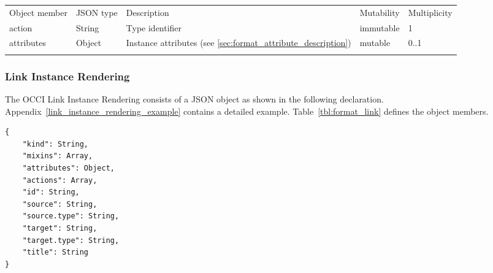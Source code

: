 \documentclass[10pt,a4paper]{article}
\begin{document}
 {
    \begin{tabularx}{\textwidth}{llXll}
    \toprule
    Object member & JSON type & Description & Mutability & Multiplicity \\
    \colrule
    action & String & Type identifier & immutable & 1 \\

    attributes & Object & Instance attributes (see
\ref{sec:format_attribute_description}) & mutable & 0..1 \\
    \botrule
    \end{tabularx}
}


\subsubsection{Link Instance Rendering}
\label{sec:format_link}

The OCCI Link Instance Rendering consists of a JSON object as shown in the
following declaration. Appendix~\ref{link_instance_rendering_example} contains a detailed example.
Table~\ref{tbl:format_link} defines the object members.
\begin{lstlisting}
{
    "kind": String,
    "mixins": Array,
    "attributes": Object,
    "actions": Array,
    "id": String,
    "source": String,
    "source.type": String,
    "target": String,
    "target.type": String,
    "title": String
}
\end{lstlisting}
\end{document}
